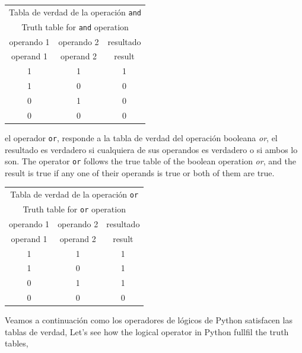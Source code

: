 \begin{table}[h]
\centering
\begin{tabular}{c|c|c}
\multicolumn{3}{c}{Tabla de verdad de la operación \texttt{and}}\\
\multicolumn{3}{c}{Truth table for \texttt{and} operation}\\
\hline
\hline
operando 1&operando 2 &resultado\\
operand 1 & operand 2 & result\\
\hline
1&1&1\\
1&0&0\\
0&1&0\\
0&0&0\\ 
\hline
\hline
\end{tabular}
\end{table}

\begin{paracol}{2}
el operador \texttt{or}, responde a la tabla de verdad del operación booleana \emph{or}, el resultado es verdadero si cualquiera de sus operandos es verdadero o si ambos lo son.
\switchcolumn
The operator \texttt{or} follows the true table of the boolean operation \emph{or}, and the result is true if any one of their operands is true or both of them are true. 
\end{paracol}

\begin{table}[h]
\centering
\begin{tabular}{c|c|c}
\multicolumn{3}{c}{Tabla de verdad de la operación \texttt{or}}\\
\multicolumn{3}{c}{Truth table for \texttt{or} operation}\\
\hline
\hline
operando 1&operando 2 &resultado\\
operand 1 & operand 2 & result\\ 
\hline
1&1&1\\
1&0&1\\
0&1&1\\
0&0&0\\ 
\hline
\hline
\end{tabular}
\end{table} 
\begin{paracol}{2}
Veamos a continuación como los operadores de lógicos de Python satisfacen las tablas de verdad,
\switchcolumn
Let's see how the logical operator in Python fullfil the truth tables,
\end{paracol}

